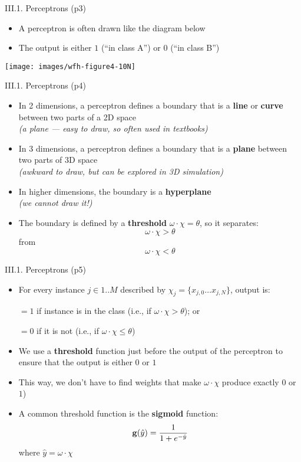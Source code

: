 \documentclass[handout]{beamer}
\newcommand{\strong}[1]{\textbf{\color{teal} #1}}
\begin{document}
\begin{frame}{III.1. Perceptrons (p3)}
\begin{itemize}
\item A perceptron is often drawn like the diagram below
\item The output is either $1$ (``in class A'') or $0$ (``in class B'')
\end{itemize}
\begin{center}
\texttt{[image: images/wfh-figure4-10N]}\\
\cite[Figure 4.10]{WFH3:2011}
\end{center}
\end{frame}
\begin{frame}{III.1. Perceptrons (p4)}
\begin{itemize}
\item In 2 dimensions, a perceptron defines a boundary that is a \strong{line} or \strong{curve} between two parts of a 2D space \\
\emph{(a plane --- easy to draw, so often used in textbooks)}
\item In 3 dimensions, a perceptron defines a boundary that is a \strong{plane} between two parts of 3D space \\
\emph{(awkward to draw, but can be explored in 3D simulation)}
\item In higher dimensions, the boundary is a \strong{hyperplane} \\
\emph{(we cannot draw it!)}
\item The boundary is defined by a \strong{threshold} 
$\omega \cdot \chi = \theta$, so it separates:
\[
\omega \cdot \chi > \theta
\]
from
\[
\omega \cdot \chi < \theta
\]
\end{itemize}
\end{frame}
\begin{frame}{III.1. Perceptrons (p5)}
\begin{itemize}
\item For every instance $j \in 1..M$ described by $\chi_j=\{x_{j,0} \ldots x_{j,N}\}$, output is:\\
\item[$=1$] if instance is in the class (i.e., if $\omega \cdot \chi > \theta$); or
\item[$=0$] if it is not (i.e., if $\omega \cdot \chi \le \theta$)
\item[]
\item We use a \strong{threshold} function just before the output of the perceptron to ensure that the output is either $0$ or $1$
\item This way, we don't have to find weights that make $\omega \cdot \chi$ produce exactly $0$ or $1$)
\item A common threshold function is the \strong{sigmoid} function:
\[
{\bf g}(\hat{y}) = \frac{1}{1 + e^{-\hat{y}}}
\]
where $\hat{y} = \omega \cdot \chi$
\end{itemize}
\end{frame}
\end{document}
